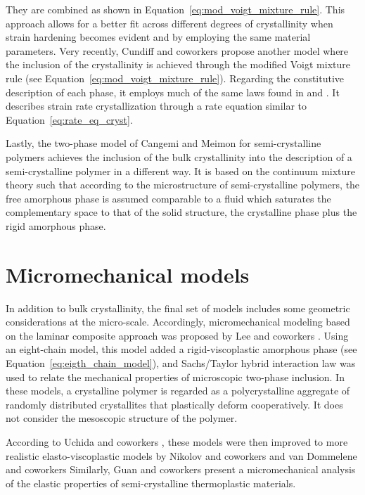 They are combined as shown in Equation~\eqref{eq:mod_voigt_mixture_rule}.
This approach allows for a better fit across different degrees of crystallinity when strain hardening becomes evident and by employing the same material parameters.
Very recently, Cundiff and coworkers \citep{cundiffModelingViscoplasticBehavior2022} propose another model where the inclusion of the crystallinity is achieved through the modified Voigt mixture rule (see Equation~\eqref{eq:mod_voigt_mixture_rule}).
Regarding the constitutive description of each phase, it employs much of the same laws found in \cite{ahziModelingDeformationBehavior2003} and \cite{chowdhuryEffectsManufacturingInducedVoids2008}.
It describes strain rate crystallization through a rate equation similar to Equation~\eqref{eq:rate_eq_cryst}.

Lastly, the two-phase model of Cangemi and Meimon for semi-crystalline polymers \citep{cangemiTwoPhaseModelMechanical2001} achieves the inclusion of the bulk crystallinity into the description of a semi-crystalline polymer in a different way.
It is based on the continuum mixture theory such that according to the microstructure of semi-crystalline polymers, the free amorphous phase is assumed comparable to a fluid which saturates the complementary space to that of the solid structure, the crystalline phase plus the rigid amorphous phase.

\section{Micromechanical models}

In addition to bulk crystallinity, the final set of models includes some geometric considerations at the micro-scale.
Accordingly, micromechanical modeling based on the laminar composite approach was proposed by Lee and coworkers \citep{leeMicromechanicalModelingLarge1993, leeSimulationLargeStrain1993}.
Using an eight-chain model, this model added a rigid-viscoplastic amorphous phase (see Equation~\eqref{eq:eigth_chain_model}), and Sachs/Taylor hybrid interaction law was used to relate the mechanical properties of microscopic two-phase inclusion.
In these models, a crystalline polymer is regarded as a polycrystalline aggregate of randomly distributed crystallites that plastically deform cooperatively.
It does not consider the mesoscopic structure of the polymer.

According to Uchida and coworkers \citep{uchidaMicroMesoMacroscopic2013}, these models were then improved to more realistic elasto-viscoplastic models by Nikolov and coworkers \citep{nikolovMicroMacroConstitutive2000, nikolovMultiscaleConstitutiveModeling2002} and van Dommelene and coworkers \citep{vandommelenMicromechanicalModelingElastoviscoplastic2003}
Similarly, Guan and coworkers \citep{guanMicromechanicalModelElastic2004} present a micromechanical analysis of the elastic properties of semi-crystalline thermoplastic materials.

